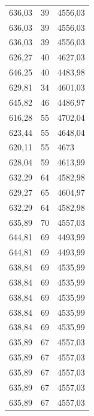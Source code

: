 \begin{center}
\begin{longtable}{|l|l|l|}
636,03            & 39               & 4556,03        \\
636,03            & 39               & 4556,03        \\
636,03            & 39               & 4556,03        \\
626,27            & 40               & 4627,03        \\
646,25            & 40               & 4483,98        \\
629,81            & 34               & 4601,03        \\
645,82            & 46               & 4486,97        \\
616,28            & 55               & 4702,04        \\
623,44            & 55               & 4648,04        \\
620,11            & 55               & 4673           \\
628,04            & 59               & 4613,99        \\
632,29            & 64               & 4582,98        \\
629,27            & 65               & 4604,97        \\
632,29            & 64               & 4582,98        \\
635,89            & 70               & 4557,03        \\
644,81            & 69               & 4493,99        \\
644,81            & 69               & 4493,99        \\
638,84            & 69               & 4535,99        \\
638,84            & 69               & 4535,99        \\
638,84            & 69               & 4535,99        \\
638,84            & 69               & 4535,99        \\
638,84            & 69               & 4535,99        \\
635,89            & 67               & 4557,03        \\
635,89            & 67               & 4557,03        \\
635,89            & 67               & 4557,03        \\
635,89            & 67               & 4557,03        \\
635,89            & 67               & 4557,03        \\

\end{longtable}
\end{center}
